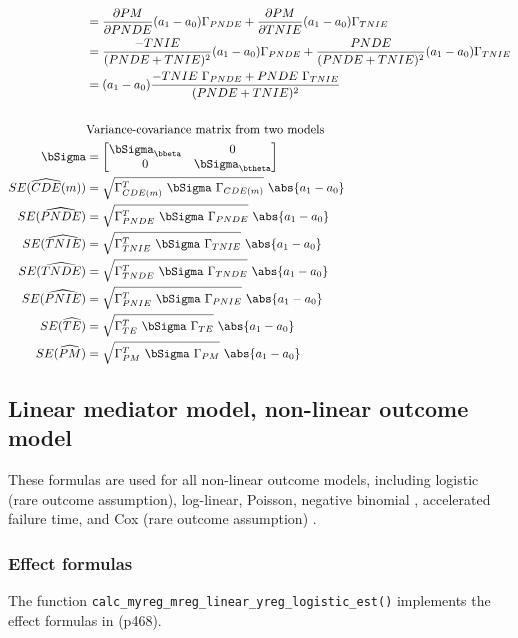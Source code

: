 \documentclass[10pt]{article}
\begin{document}
\begin{align*}
  &= \frac{\partial PM}{\partial PNDE}(a_{1}-a_{0})\Gamma_{PNDE} + \frac{\partial PM}{\partial TNIE}(a_{1}-a_{0})\Gamma_{TNIE}\\
  &= \frac{-TNIE}{(PNDE+TNIE)^{2}}(a_{1}-a_{0})\Gamma_{PNDE} + \frac{PNDE}{(PNDE+TNIE)^{2}}(a_{1}-a_{0})\Gamma_{TNIE}\\
  &= (a_{1}-a_{0}) \frac{-TNIE~\Gamma_{PNDE} + PNDE~\Gamma_{TNIE}}{(PNDE+TNIE)^{2}}\\
  \\
  &\text{Variance-covariance matrix from two models}\\
  \bSigma &=
           \begin{bmatrix}
             \bSigma_{\bbeta} & 0 \\
             0 & \bSigma_{\btheta} \\
           \end{bmatrix}\\
  SE(\widehat{CDE}(m)) &= \sqrt{\Gamma_{CDE(m)}^{T} ~\bSigma~ \Gamma_{CDE(m)}} ~ \abs{a_{1} - a_{0}}\\
  SE(\widehat{PNDE}) &= \sqrt{\Gamma_{PNDE}^{T} ~\bSigma~ \Gamma_{PNDE}} ~ \abs{a_{1} - a_{0}}\\
  SE(\widehat{TNIE}) &= \sqrt{\Gamma_{TNIE}^{T} ~\bSigma~ \Gamma_{TNIE}} ~ \abs{a_{1} - a_{0}}\\
  SE(\widehat{TNDE}) &= \sqrt{\Gamma_{TNDE}^{T} ~\bSigma~ \Gamma_{TNDE}} ~ \abs{a_{1} - a_{0}}\\
  SE(\widehat{PNIE}) &= \sqrt{\Gamma_{PNIE}^{T} ~\bSigma~ \Gamma_{PNIE}} ~ \abs{a_{1} - a_{0}}\\
  SE(\widehat{TE}) &= \sqrt{\Gamma_{TE}^{T} ~\bSigma~ \Gamma_{TE}} ~ \abs{a_{1} - a_{0}}\\
  SE(\widehat{PM}) &= \sqrt{\Gamma_{PM}^{T} ~\bSigma~ \Gamma_{PM}} ~ \abs{a_{1} - a_{0}}\\
\end{align*}


\subsection{Linear mediator model, non-linear outcome model}
\label{sec:orgf750e33}
These formulas are used for all non-linear outcome models, including logistic (rare outcome assumption), log-linear, Poisson, negative binomial \cite{valeriMediationAnalysisAllowing2013}, accelerated failure time, and Cox (rare outcome assumption) \cite{valeriSASMacroCausal2015}.

\subsubsection{Effect formulas}
\label{sec:org421d962}
The function \texttt{calc\_myreg\_mreg\_linear\_yreg\_logistic\_est()} implements the effect formulas in \cite{vanderweeleExplanationCausalInference2015} (p468).
\end{document}
